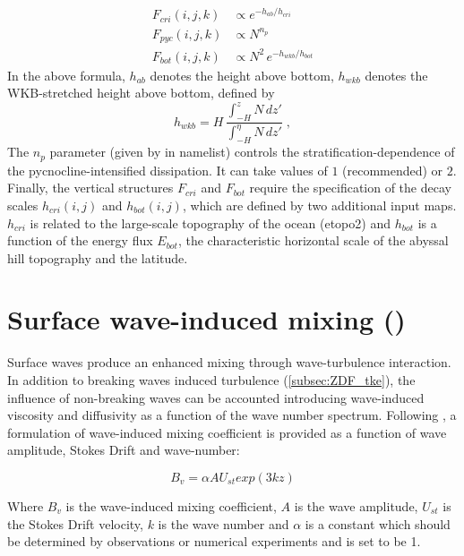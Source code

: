 \documentclass[../main/NEMO_manual]{subfiles}
\begin{document}
\begin{align*}
  F_{cri}(i,j,k) &\propto e^{-h_{ab} / h_{cri} }\\
  F_{pyc}(i,j,k) &\propto N^{n_p}\\
  F_{bot}(i,j,k) &\propto N^2 \, e^{- h_{wkb} / h_{bot} }
\end{align*}
In the above formula, $h_{ab}$ denotes the height above bottom,
$h_{wkb}$ denotes the WKB-stretched height above bottom, defined by
\[
  h_{wkb} = H \, \frac{ \int_{-H}^{z} N \, dz' } { \int_{-H}^{\eta} N \, dz'  } \; ,
\]
The $n_p$ parameter (given by  in  namelist)
controls the stratification-dependence of the pycnocline-intensified dissipation.
It can take values of $1$ (recommended) or $2$.
Finally, the vertical structures $F_{cri}$ and $F_{bot}$ require the specification of
the decay scales $h_{cri}(i,j)$ and $h_{bot}(i,j)$, which are defined by two additional input maps.
$h_{cri}$ is related to the large-scale topography of the ocean (etopo2) and
$h_{bot}$ is a function of the energy flux $E_{bot}$, the characteristic horizontal scale of
the abyssal hill topography \citep{goff_JGR10} and the latitude.

\section[Surface wave-induced mixing (\forcode{ln_zdfswm})]{Surface wave-induced mixing (\protect{})}
\label{subsec:ZDF_swm}

Surface waves produce an enhanced mixing through wave-turbulence interaction.
In addition to breaking waves induced turbulence (\autoref{subsec:ZDF_tke}),
the influence of non-breaking waves can be accounted introducing
wave-induced viscosity and diffusivity as a function of the wave number spectrum.
Following \citet{qiao.yuan.ea_OD10}, a formulation of wave-induced mixing coefficient
is provided  as a function of wave amplitude, Stokes Drift and wave-number:

\begin{equation}
  \label{eq:ZDF_Bv}
  B_{v} = \alpha {A} {U}_{st} {exp(3kz)}
\end{equation}

Where $B_{v}$ is the wave-induced mixing coefficient, $A$ is the wave amplitude,
${U}_{st}$ is the Stokes Drift velocity, $k$ is the wave number and $\alpha$
is a constant which should be determined by observations or
numerical experiments and is set to be 1.
\end{document}
